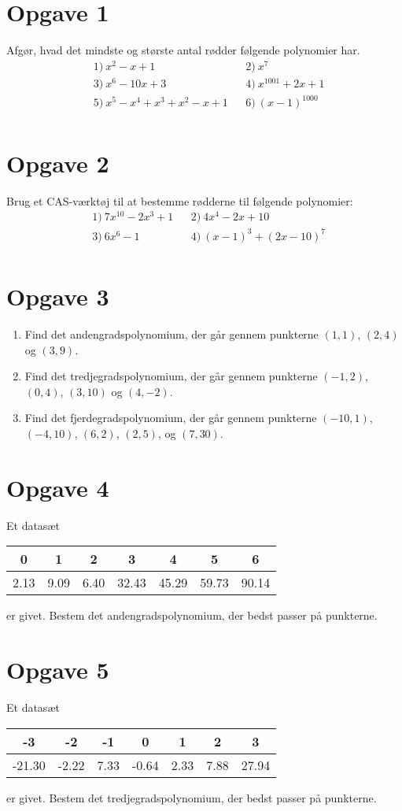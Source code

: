 \section*{Opgave 1}
Afgør, hvad det mindste og største antal rødder følgende polynomier har.
\begin{align*}
&1) \  x^2-x+1   &&2) \ x^7   \\
&3) \   x^6-10x+3  &&4) \ x^{1001}+2x+1   \\
&5) \   x^{5}-x^4+x^3+x^2-x+1  &&6) \ (x-1)^{1000}   \\
\end{align*}

\section*{Opgave 2}
Brug et CAS-værktøj til at bestemme rødderne til følgende polynomier:
\begin{align*}
&1) \ 7x^{10}-2x^3+1   &&2) \ 4x^4-2x+10   \\
&3) \ 6x^6-1   &&4) \  (x-1)^3 +(2x-10)^7  \\
\end{align*}

\section*{Opgave 3}
\begin{enumerate}[label=\roman*)]
\item Find det andengradspolynomium, der går gennem punkterne $(1,1)$, $(2,4)$ og $(3,9)$.
\item Find det tredjegradspolynomium, der går gennem punkterne $(-1,2)$, $(0,4)$, $(3,10)$ og $(4,-2)$.
\item Find det fjerdegradspolynomium, der går gennem punkterne $(-10,1)$, $(-4,10)$, $(6,2)$, $(2,5)$, og $(7,30)$.
\end{enumerate}

\section*{Opgave 4}
Et datasæt 
\begin{center}
\begin{tabular}{c|c|c|c|c|c|c}
0 & 1 & 2 & 3 & 4 & 5 & 6\\ \hline
2.13 & 9.09 & 6.40 & 32.43 & 45.29 & 59.73 & 90.14
\end{tabular}
\end{center}
er givet. Bestem det andengradspolynomium, der bedst passer på punkterne. 

\section*{Opgave 5}
Et datasæt
\begin{center}
\begin{tabular}{c|c|c|c|c|c|c}
-3 & -2 & -1 & 0 & 1 & 2 & 3\\ \hline
-21.30 & -2.22 & 7.33 & -0.64 & 2.33 & 7.88 & 27.94
\end{tabular}
\end{center}
er givet. Bestem det tredjegradspolynomium, der bedst passer på punkterne. 